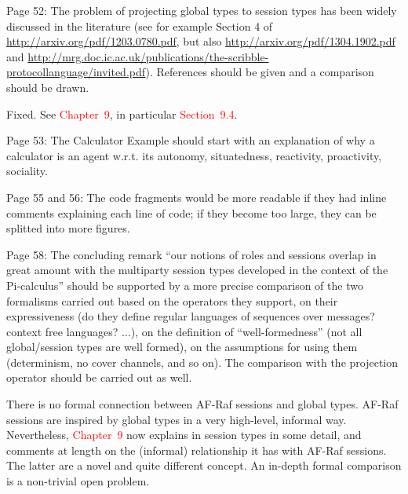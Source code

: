 \documentclass{article}
\newcommand*\R[1]{\textcolor{red}{#1}} %
\newcommand{\todo}[1]{[\textcolor{red}{TODO}: #1]}
\newenvironment{them}{\noindent\begingroup\color{blue}}{\endgroup\par}
\begin{document}
\begin{them}

Page 52:
The problem of projecting global types to session types has been widely
discussed in the literature (see for example Section 4 of
\url{http://arxiv.org/pdf/1203.0780.pdf}, but also
\url{http://arxiv.org/pdf/1304.1902.pdf} and
\url{http://mrg.doc.ic.ac.uk/publications/the-scribble-protocollanguage/invited.pdf}).
References should be given and a comparison should be drawn.

\end{them}

Fixed.
See \R{Chapter~9},
  in particular \R{Section~9.4}.

\begin{them}

Page 53:
The Calculator Example should start with an explanation of why a calculator is
an agent w.r.t. its autonomy, situatedness, reactivity, proactivity, sociality.

\end{them}
\todo{}

\begin{them}

Page 55 and 56:
The code fragments would be more readable if they had inline comments
explaining each line of code; if they become too large, they can be splitted
into more figures.

\end{them}
\todo{}

\begin{them}

Page 58:
The concluding remark “our notions of roles and sessions overlap in great
amount with the multiparty session types developed in the context of the
Pi-calculus” should be supported by a more precise comparison of the two
formalisms carried out based on the operators they support, on their
expressiveness (do they define regular languages of sequences over messages?
context free languages? ...), on the definition of “well-formedness” (not all
global/session types are well formed), on the assumptions for using them
(determinism, no cover channels, and so on). The comparison with the projection
operator should be carried out as well.

\end{them}

There is no formal connection between AF-Raf sessions and global types.
AF-Raf sessions are inspired by global types in a very high-level,
  informal way.
Nevertheless,
  \R{Chapter~9} now explains in session types in some detail,
  and comments at length on the (informal) relationship it has with
    AF-Raf sessions.
The latter are a novel and quite different concept.
An in-depth formal comparison is a non-trivial open problem.
\end{document}
